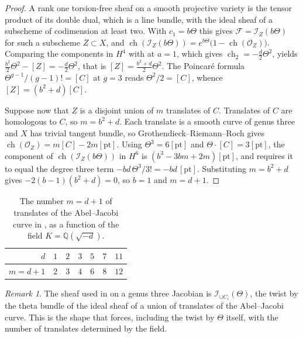 \documentclass[11pt,reqno]{amsart}
\theoremstyle{plain}
\theoremstyle{definition}
\theoremstyle{remark}
\newtheorem{remark}[theorem]{Remark}
\newcommand{\QQ}{\mathbb{Q}}
\newcommand{\cF}{\mathcal{F}}
\newcommand{\cO}{\mathcal{O}}
\DeclareMathOperator{\ch}{ch}
\begin{document}
\begin{proof}
A rank one torsion-free sheaf on a smooth projective variety is the tensor
product of its double dual, which is a line bundle, with the ideal sheaf of a
subscheme of codimension at least two. With $c_{1}=b\Theta$ this gives
$\cF=\mathcal{I}_{Z}(b\Theta)$ for such a subscheme $Z\subset X$, and
$\ch(\mathcal{I}_{Z}(b\Theta))=e^{b\Theta}\bigl(1-\ch(\cO_{Z})\bigr)$.
Comparing the components in $H^{4}$ with  at $a=1$,
which gives $\ch_{2}=-\tfrac{d}{2}\Theta^{2}$, yields
$\tfrac{b^{2}}{2}\Theta^{2}-[Z]=-\tfrac{d}{2}\Theta^{2}$, that is
$[Z]=\tfrac{b^{2}+d}{2}\Theta^{2}$. The Poincar\'e formula
$\Theta^{g-1}/(g-1)!=[C]$ at $g=3$ reads $\Theta^{2}/2=[C]$, whence
$[Z]=(b^{2}+d)[C]$.

Suppose now that $Z$ is a disjoint union of $m$ translates of $C$. Translates
of $C$ are homologous to $C$, so $m=b^{2}+d$. Each translate is a smooth curve
of genus three and $X$ has trivial tangent bundle, so Grothendieck--Riemann--Roch
gives $\ch(\cO_{Z})=m[C]-2m[\mathrm{pt}]$. Using $\Theta^{3}=6[\mathrm{pt}]$
and $\Theta\cdot[C]=3[\mathrm{pt}]$, the component of
$\ch(\mathcal{I}_{Z}(b\Theta))$ in $H^{6}$ is
$(b^{3}-3bm+2m)[\mathrm{pt}]$, and  requires it to
equal the degree three term $-bd\,\Theta^{3}/3!=-bd\,[\mathrm{pt}]$.
Substituting $m=b^{2}+d$ gives $-2(b-1)(b^{2}+d)=0$, so $b=1$ and $m=d+1$.
\end{proof}

\begin{table}[htbp]
\centering
\renewcommand{\arraystretch}{1.15}
\begin{tabular}{@{}rrrrrrr@{}}
\toprule
$d$ & $1$ & $2$ & $3$ & $5$ & $7$ & $11$ \\
\midrule
$m=d+1$ & $2$ & $3$ & $4$ & $6$ & $8$ & $12$ \\
\bottomrule
\end{tabular}
\caption{The number $m=d+1$ of translates of the Abel--Jacobi curve in
, as a function of the field $K=\QQ(\sqrt{-d})$.}
\label{tab:translates}
\end{table}

\begin{remark}\label{rem:markmancheck}
The sheaf used in \cite{Mar25b} on a genus three Jacobian is
$\mathcal{I}_{\cup C_{i}}(\Theta)$, the twist by the theta bundle of the ideal
sheaf of a union of translates of the Abel--Jacobi curve. This is the shape
that  forces, including the twist by $\Theta$ itself, with
the number of translates determined by the field.
\end{remark}
\end{document}
